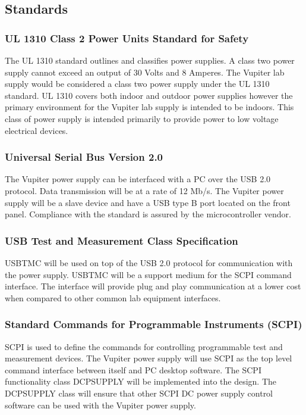 \documentclass[12pt]{article}
\begin{document}
\subsection{Standards}
\subsubsection{UL 1310 Class 2 Power Units Standard for Safety}
The UL 1310 standard outlines and classifies power supplies. A class two power 
supply cannot exceed an output of 30 Volts and 8 Amperes. The Vupiter lab supply 
would be considered a class two power supply under the UL 1310 standard.
UL 1310 covers both indoor and outdoor power supplies however the primary environment
for the Vupiter lab supply is intended to be indoors. This class of power supply is 
intended primarily to provide power to low voltage electrical devices. 

\subsubsection{Universal Serial Bus Version 2.0}
The Vupiter power supply can be interfaced with a PC over the USB 2.0 protocol. Data 
transmission will be at a rate of 12 Mb/s. The Vupiter power supply will be a slave
device and have a USB type B port located on the front panel. Compliance with the standard 
is assured by the microcontroller vendor.

\subsubsection{USB Test and Measurement Class Specification}
USBTMC will be used on top of the USB 2.0 protocol for communication with the power supply.
USBTMC will be a support medium for the SCPI command interface. The interface will provide 
plug and play communication at a lower cost when compared to other common lab equipment interfaces. 

\subsubsection{Standard Commands for Programmable Instruments (SCPI)}
SCPI is used to define the commands for controlling programmable test and 
measurement devices. The Vupiter power supply will use SCPI as the top level command
interface between itself and PC desktop software. The SCPI functionality class DCPSUPPLY
will be implemented into the design. The DCPSUPPLY class will ensure that other SCPI
DC power supply control software can be used with the Vupiter power supply. 
\end{document}
